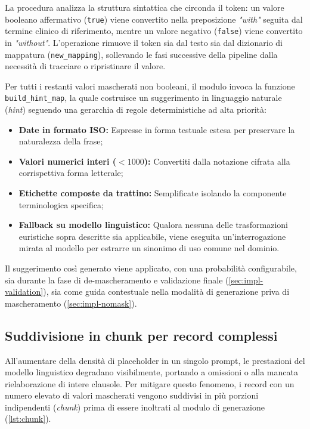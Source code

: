 \documentclass[12pt,a4paper,openright,twoside]{book}
\begin{document}
La procedura analizza la struttura sintattica che circonda il token: un valore
booleano affermativo (\texttt{true}) viene convertito nella preposizione
\emph{"with"} seguita dal termine clinico di riferimento, mentre un valore
negativo (\texttt{false}) viene convertito in \emph{"without"}. L'operazione
rimuove il token sia dal testo sia dal dizionario di mappatura
(\texttt{new\_mapping}), sollevando le fasi successive della pipeline dalla
necessità di tracciare o ripristinare il valore.

Per tutti i restanti valori mascherati non booleani, il modulo invoca la
funzione \texttt{build\_hint\_map}, la quale costruisce un suggerimento in
linguaggio naturale (\textit{hint}) seguendo una gerarchia di regole
deterministiche ad alta priorità:

\begin{itemize}
    \item \textbf{Date in formato ISO:} Espresse in forma testuale estesa per
          preservare la naturalezza della frase;
    \item \textbf{Valori numerici interi ($< 1000$):} Convertiti dalla notazione
          cifrata alla corrispettiva forma letterale;
    \item \textbf{Etichette composte da trattino:} Semplificate isolando la
          componente terminologica specifica;
    \item \textbf{Fallback su modello linguistico:} Qualora nessuna delle
          trasformazioni euristiche sopra descritte sia applicabile, viene
          eseguita un'interrogazione mirata al modello per estrarre un sinonimo
          di uso comune nel dominio.
\end{itemize}

Il suggerimento così generato viene applicato, con una probabilità
configurabile, sia durante la fase di de-mascheramento e validazione finale
(\cref{sec:impl-validation}), sia come guida contestuale nella modalità di
generazione priva di mascheramento (\cref{sec:impl-nomask}).

\subsection{Suddivisione in chunk per record complessi}
\label{sec:impl-chunk}

All'aumentare della densità di placeholder in un singolo prompt, le prestazioni
del modello linguistico degradano visibilmente, portando a omissioni o alla
mancata rielaborazione di intere clausole. Per mitigare questo fenomeno, i
record con un numero elevato di valori mascherati vengono suddivisi in più
porzioni indipendenti (\textit{chunk}) prima di essere inoltrati al modulo di
generazione (\cref{lst:chunk}).
\end{document}
